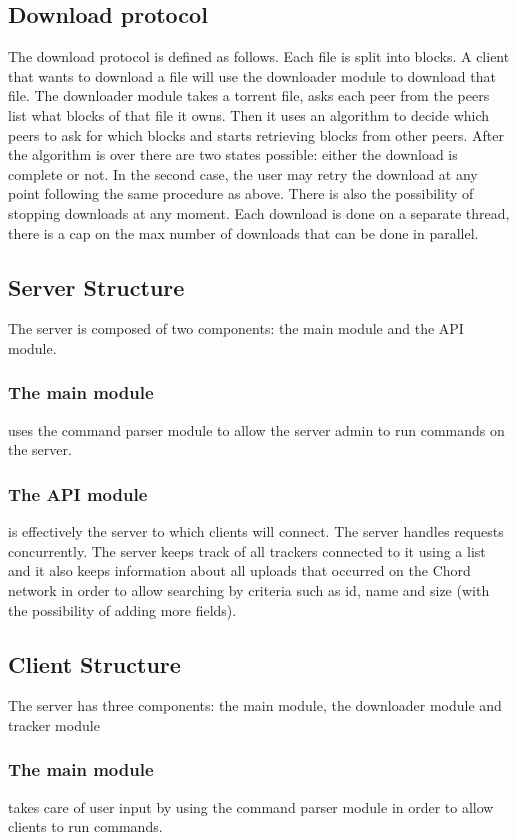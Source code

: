 \documentclass[runningheads]{llncs}
\begin{document}
\subsection{Download protocol} \label{download_protocol}
The download protocol is defined as follows. Each file is split into blocks. A client that wants to download a file will use the downloader module to download that file. The downloader module takes a torrent file, asks each peer from the peers list what blocks of that file it owns. Then it uses an algorithm to decide which peers to ask for which blocks and starts retrieving blocks from other peers. After the algorithm is over there are two states possible: either the download is complete or not. In the second case, the user may retry the download at any point following the same procedure as above. There is also the possibility of stopping downloads at any moment. Each download is done on a separate thread, there is a cap on the max number of downloads that can be done in parallel.

\subsection{Server Structure} \label{server_structure}
The server is composed of two components: the main module and the API module.
\subsubsection{The main module}
uses the command parser module to allow the server admin to run commands on the server.
\subsubsection{The API module}
is effectively the server to which clients will connect. The server handles requests concurrently. The server keeps track of all trackers connected to it using a list and it also keeps information about all uploads that occurred on the Chord network in order to allow searching by criteria such as id, name and size (with the possibility of adding more fields).

\subsection{Client Structure} \label{client_structure}
The server has three components: the main module, the downloader module and tracker module
\subsubsection{The main module}
takes care of user input by using the command parser module in order to allow clients to run commands.
\end{document}

